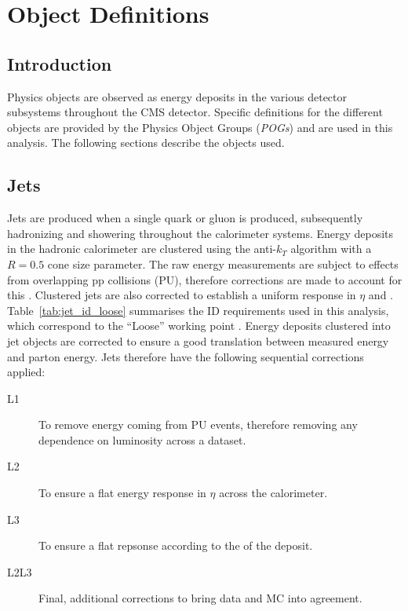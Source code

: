 \chapter{Object Definitions}
\label{ch:objects}

\ifpdf
    \graphicspath{{Chapter4/Figs/Raster/}{Chapter4/Figs/PDF/}{Chapter4/Figs/}}
\else
    \graphicspath{{Chapter4/Figs/Vector/}{Chapter4/Figs/}}
\fi


\section{Introduction}  %
\label{sec:objects_introduction}

Physics objects are observed as energy deposits in the various detector 
subsystems throughout the CMS detector. Specific definitions for the different 
objects are provided by the Physics Object Groups (\emph{POGs}) and are used in this 
analysis. The following sections describe the objects used.


\section{Jets}  %
\label{sec:objects_jets}

Jets are produced when a single quark or gluon is produced, subsequently 
hadronizing and showering throughout the calorimeter systems. Energy deposits in
the hadronic calorimeter are clustered using the anti-$k_T$ algorithm \cite{antikt} with
a $R=0.5$ cone size parameter. The raw energy measurements are subject to 
effects from overlapping pp collisions (PU), therefore corrections are made to
account for this \cite{Cacciari2008119, 1126-6708-2008-04-005}. Clustered jets 
are also corrected to establish a uniform response in $\eta$ and \Pt
\cite{Chatrchyan:2011ds}.
Table~\ref{tab:jet_id_loose} summarises the ID requirements used in this 
analysis, which correspond to the ``Loose'' working point \cite{ref:jet-id}.
Energy deposits clustered into jet objects are corrected to ensure a
good translation between measured energy and parton energy.
Jets therefore have the following sequential corrections \cite{ref:jet-jes}
\cite{2011JInst...611002C} applied:
\begin{description}
\item[L1] To remove energy coming from PU events, therefore removing any
dependence on luminosity across a dataset.
\item[L2] To ensure a flat energy response in $\eta$ across the calorimeter.
\item[L3] To ensure a flat repsonse according to the \Pt of the deposit.
\item[L2L3] Final, additional corrections to bring data and MC into agreement.
\end{description}


